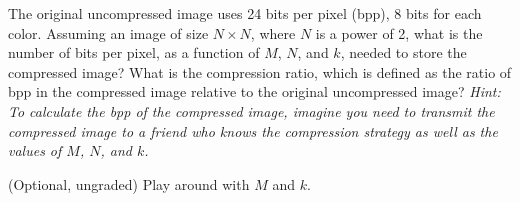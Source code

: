 \begin{problem}
The original uncompressed image uses 24 bits per pixel (bpp), 8 bits for each
color. Assuming an image of size $N \times N$, where $N$ is a power of 2, what is the number
of bits per pixel, as a function of $M$, $N$, and $k$, needed to store the compressed image?
What is the compression ratio, which is defined as the ratio of bpp in the compressed
image relative to the original uncompressed image? \emph{Hint: To calculate the bpp of the
compressed image, imagine you need to transmit the compressed image to a friend who
knows the compression strategy as well as the values of $M$, $N$, and $k$.}
\end{problem}

\begin{problem}
(Optional, ungraded) Play around with $M$ and $k$.
\end{problem}
